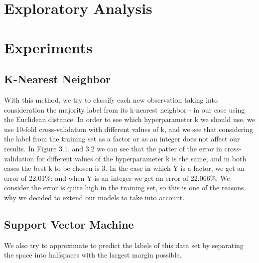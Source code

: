\documentclass[paper=a4, fontsize=11pt]{scrartcl}
\numberwithin{equation}{section}
\numberwithin{figure}{section}
\numberwithin{table}{section}
\begin{document}

\section{Exploratory Analysis}





\section{Experiments}

\subsection{K-Nearest Neighbor}

With this method, we try to classify each new observation taking into consideration the majority label from its k-nearest neighbor - in our case using the Euclidean distance. In order to see which hyperparameter k we should use, we use 10-fold cross-validation with different values of k, and we see that considering the label from the training set as a factor or as an integer does not affect our results. In Figure 3.1. and 3.2 we can see that the patter of the error in cross-validation for different values of the hyperparameter k is the same, and in both cases the best k to be chosen is 3. In the case in which Y is a factor, we get an error of 22.01\%; and when Y is an integer we get an error of 22.066\%. We consider the error is quite high in the training set, so this is one of the reasons why we decided to extend our models to take into account. 




\subsection{Support Vector Machine}
We also try to approximate to predict the labels of this data set by separating the space into halfspaces with the largest margin possible. 
\end{document}
